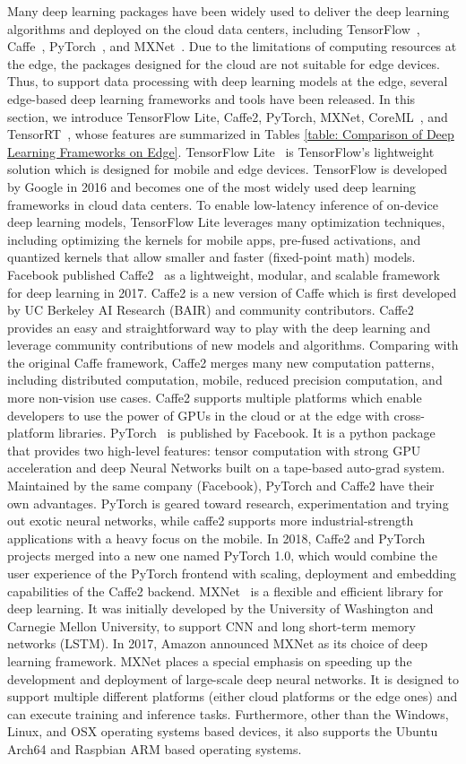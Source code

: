 Many deep learning packages have been widely used to deliver the deep learning algorithms and deployed on the cloud data centers, including TensorFlow~, Caffe~, PyTorch~, and MXNet~. Due to the limitations of computing resources at the edge, the packages designed for the cloud are not suitable for edge devices. Thus, to support data processing with deep learning models at the edge, several edge-based deep learning frameworks and tools have been released. In this section, we introduce TensorFlow Lite, Caffe2, PyTorch, MXNet, CoreML~, and TensorRT~, whose features are summarized in Tables \ref{table: Comparison of Deep Learning Frameworks on Edge}.
TensorFlow Lite~ is TensorFlow's lightweight solution which is designed for mobile and edge devices. TensorFlow is developed by Google in 2016 and becomes one of the most widely used deep learning frameworks in cloud data centers. To enable low-latency inference of on-device deep learning models, TensorFlow Lite leverages many optimization techniques, including optimizing the kernels for mobile apps, pre-fused activations, and quantized kernels that allow smaller and faster (fixed-point math) models. 
Facebook published Caffe2~ as a lightweight, modular, and scalable framework for deep learning in 2017. Caffe2 is a new version of Caffe which is first developed by UC Berkeley AI Research (BAIR) and community contributors. Caffe2 provides an easy and straightforward way to play with the deep learning and leverage community contributions of new models and algorithms. Comparing with the original Caffe framework, Caffe2 merges many new computation patterns, including distributed computation, mobile, reduced precision computation, and more non-vision use cases. Caffe2 supports multiple platforms which enable developers to use the power of GPUs in the cloud or at the edge with cross-platform libraries.
PyTorch~ is published by Facebook. It is a python package that provides two high-level features: tensor computation with strong GPU acceleration and deep Neural Networks built on a tape-based auto-grad system. Maintained by the same company (Facebook), PyTorch and Caffe2 have their own advantages. PyTorch is geared toward research, experimentation and trying out exotic neural networks, while caffe2 supports more industrial-strength applications with a heavy focus on the mobile. In 2018, Caffe2 and PyTorch projects merged into a new one named PyTorch 1.0, which would combine the user experience of the PyTorch frontend with scaling, deployment and embedding capabilities of the Caffe2 backend.
MXNet~ is a flexible and efficient library for deep learning. It was initially developed by the University of Washington and Carnegie Mellon University, to support CNN and long short-term memory networks (LSTM). In 2017, Amazon announced MXNet as its choice of deep learning framework. MXNet places a special emphasis on speeding up the development and deployment of large-scale deep neural networks. It is designed to support multiple different platforms (either cloud platforms or the edge ones) and can execute training and inference tasks.  Furthermore, other than the Windows, Linux, and OSX operating systems based devices, it also supports the Ubuntu Arch64 and Raspbian ARM based operating systems.
